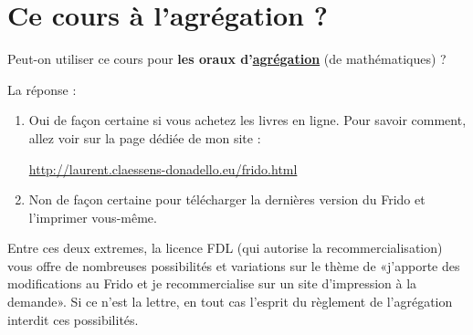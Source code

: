 
\section*{Ce cours à l'agrégation ?}

Peut-on utiliser ce cours pour \textbf{les oraux d'\href{http://agreg.org/}{agrégation}} (de mathématiques) ?  

La réponse :
\begin{enumerate}
    \item
        Oui de façon certaine si vous achetez les livres en ligne. Pour savoir comment, allez voir sur la page dédiée de mon site :
        \begin{center}
            \url{http://laurent.claessens-donadello.eu/frido.html}
        \end{center}
    \item
        Non de façon certaine pour télécharger la dernières version du Frido et l'imprimer vous-même.
\end{enumerate}
Entre ces deux extremes, la licence FDL (qui autorise la recommercialisation) vous offre de nombreuses possibilités et variations sur le thème de «j'apporte des modifications au Frido et je recommercialise sur un site d'impression à la demande». Si ce n'est la lettre, en tout cas l'esprit du règlement de l'agrégation interdit ces possibilités.

